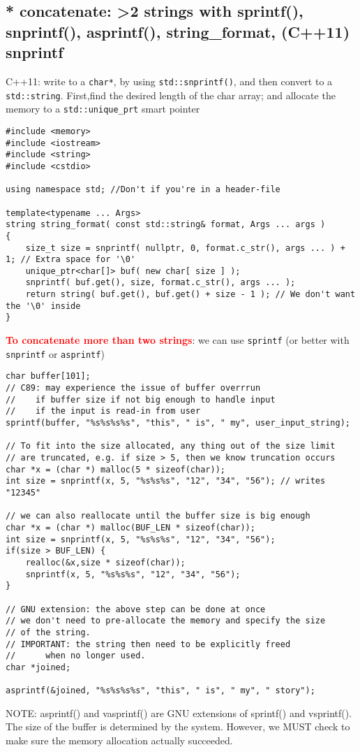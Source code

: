 \subsection{* concatenate: >2 strings with sprintf(), snprintf(), asprintf(),
string\_format, (C++11) snprintf}
\label{sec:sprintf}
\label{sec:snprintf}
\label{sec:asprintf}

C++11:  write to a \verb!char*!, by using \verb!std::snprintf()!, and then
convert to a \verb!std::string!. First,find the desired length of the char
array; and allocate the memory to a \verb!std::unique_prt! smart pointer
\begin{lstlisting}
#include <memory>
#include <iostream>
#include <string>
#include <cstdio>

using namespace std; //Don't if you're in a header-file

template<typename ... Args>
string string_format( const std::string& format, Args ... args )
{
    size_t size = snprintf( nullptr, 0, format.c_str(), args ... ) + 1; // Extra space for '\0'
    unique_ptr<char[]> buf( new char[ size ] ); 
    snprintf( buf.get(), size, format.c_str(), args ... );
    return string( buf.get(), buf.get() + size - 1 ); // We don't want the '\0' inside
}
\end{lstlisting}

\textcolor{red}{\bf To concatenate more than two strings}: we can use
\verb!sprintf! (or better with \verb!snprintf! or \verb!asprintf!)
\begin{verbatim}
char buffer[101];
// C89: may experience the issue of buffer overrrun
//    if buffer size if not big enough to handle input
//    if the input is read-in from user
sprintf(buffer, "%s%s%s%s", "this", " is", " my", user_input_string);

// To fit into the size allocated, any thing out of the size limit
// are truncated, e.g. if size > 5, then we know truncation occurs
char *x = (char *) malloc(5 * sizeof(char));
int size = snprintf(x, 5, "%s%s%s", "12", "34", "56"); // writes "12345"

// we can also reallocate until the buffer size is big enough
char *x = (char *) malloc(BUF_LEN * sizeof(char));
int size = snprintf(x, 5, "%s%s%s", "12", "34", "56");
if(size > BUF_LEN) {
    realloc(&x,size * sizeof(char));
    snprintf(x, 5, "%s%s%s", "12", "34", "56");
}

// GNU extension: the above step can be done at once
// we don't need to pre-allocate the memory and specify the size 
// of the string. 
// IMPORTANT: the string then need to be explicitly freed
//      when no longer used. 
char *joined;

asprintf(&joined, "%s%s%s%s", "this", " is", " my", " story");
\end{verbatim}
NOTE: asprintf() and vasprintf() are GNU extensions of sprintf() and vsprintf().
The size of the buffer is determined by the system. However, we MUST check to
make sure the memory allocation actually succeeded. 
 
